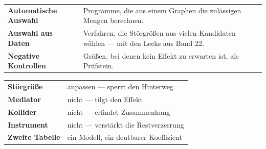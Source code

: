 \begin{forschung}
\begin{center}
{\small
\renewcommand{\arraystretch}{1.45}
\begin{tabular}{@{}P{2.8cm}P{5.4cm}@{}}
\toprule
\textbf{Automatische Auswahl} & Programme, die aus einem Graphen die zulässigen Mengen berechnen.\\
\textbf{Auswahl aus Daten} & Verfahren, die Störgrößen aus vielen Kandidaten wählen --- mit den Lecks aus Band 22.\\
\textbf{Negative Kontrollen} & Größen, bei denen kein Effekt zu erwarten ist, als Prüfstein.\\
\bottomrule
\end{tabular}}
\end{center}

\begin{center}
\begin{minipage}{0.88\textwidth}
\end{minipage}
\end{center}
\end{forschung}

\begin{merksatz}
\begin{center}
\renewcommand{\arraystretch}{1.5}
\begin{tabular}{@{}P{3.0cm}P{5.6cm}@{}}
\toprule
\textbf{Störgröße} & anpassen --- sperrt den Hinterweg\\
\textbf{Mediator} & nicht --- tilgt den Effekt\\
\textbf{Kollider} & nicht --- erfindet Zusammenhang\\
\textbf{Instrument} & nicht --- verstärkt die Restverzerrung\\
\textbf{Zweite Tabelle} & ein Modell, ein deutbarer Koeffizient\\
\bottomrule
\end{tabular}
\end{center}

\begin{center}
\begin{minipage}{0.88\textwidth}
\end{minipage}
\end{center}
\end{merksatz}
